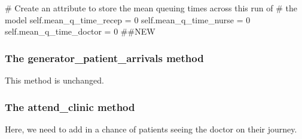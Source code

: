 \documentclass[
  letterpaper,
  DIV=11,
  numbers=noendperiod]{scrreprt}
\newenvironment{Shaded}{}{}
\newcommand{\CommentTok}[1]{\textcolor[rgb]{0.42,0.45,0.49}{#1}}
\newcommand{\DecValTok}[1]{\textcolor[rgb]{0.00,0.36,0.77}{#1}}
\newcommand{\NormalTok}[1]{\textcolor[rgb]{0.14,0.16,0.18}{#1}}
\newcommand{\OperatorTok}[1]{\textcolor[rgb]{0.14,0.16,0.18}{#1}}
\newcommand{\VariableTok}[1]{\textcolor[rgb]{0.89,0.38,0.04}{#1}}
\begin{document}
\begin{Shaded}
\begin{Highlighting}[]
        \CommentTok{\# Create an attribute to store the mean queuing times across this run of}
        \CommentTok{\# the model}
        \VariableTok{self}\NormalTok{.mean\_q\_time\_recep }\OperatorTok{=} \DecValTok{0}
        \VariableTok{self}\NormalTok{.mean\_q\_time\_nurse }\OperatorTok{=} \DecValTok{0}
        \VariableTok{self}\NormalTok{.mean\_q\_time\_doctor }\OperatorTok{=} \DecValTok{0} \CommentTok{\#\#NEW}
\end{Highlighting}
\end{Shaded}

\subsubsection{The generator\_patient\_arrivals
method}\label{the-generator_patient_arrivals-method}

This method is unchanged.

\subsubsection{The attend\_clinic
method}\label{the-attend_clinic-method}

Here, we need to add in a chance of patients seeing the doctor on their
journey.
\end{document}
